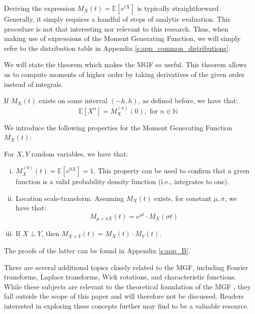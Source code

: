 \begin{remark}
    Deriving the expression \(M_X(t) = \mathbb{E}[e^{tX}]\) is typically straightforward. Generally, it simply requires a handful of steps of analytic evaluation. This procedure is not that interesting nor relevant to this research. Thus, when making use of  expressions of the Moment Generating Function, we will simply refer to the distribution table in Appendix \ref{s:app_common_distributions}.
\end{remark}

 
We will state the theorem which makes the MGF so useful. This theorem allows us to compute moments of higher order by taking derivatives of the given order instead of integrals.
\begin{theorem}\label{t:mgf}
    If \(M_X(t)\) exists on some interval \((-h, h)\), as defined before, we have that:
    \[ \mathbb{E}[X^n] = M_X^{(n)}(0), \text{ for } n \in \mathbb{N}\]  \cite{casella2002}
\end{theorem} 




We introduce the following properties for the Moment Generating Function \(M_X(t)\):
\begin{proposition}\label{p: moments}
    For \(X, Y\) random variables, we have that:
    \begin{enumerate}[(i)]
        \item \(M_X^{(0)}(t) = \mathbb{E}[e^{0X}] = 1\). This property can be used to confirm that a given function is a valid probability density function (i.e., integrates to one).
        \item Location scale-transform. Assuming \(M_X(t)\) exists, for constant \(\mu, \sigma\), we have that: 
        \[M_{\mu + \sigma X}(t) = e^{\mu t} \cdot M_X(\sigma t)\]
        \item If \(X \perp Y\), then \(M_{X+Y}(t) = M_X(t)\cdot M_Y(t)\).
    \end{enumerate}
\end{proposition}
\cite{lin2022}

The proofs of the latter can be found in Appendix \ref{s:app_B}.

There are several additional topics closely related to the MGF, including Fourier transforms, Laplace transforms, Wick rotations, and characteristic functions. While these subjects are relevant to the theoretical foundation of the MGF , they fall outside the scope of this paper and will therefore not be discussed. Readers interested in exploring these concepts further may find \cite{kolmogorov1999} to be a valuable resource.

